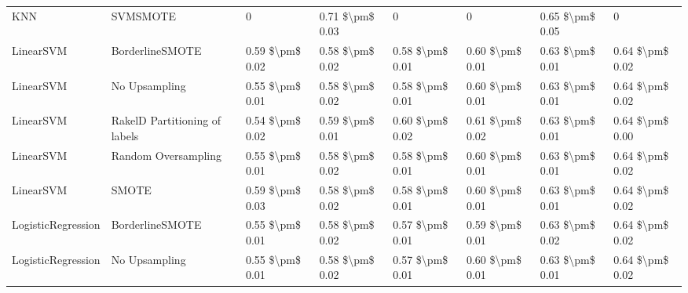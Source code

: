 \begin{tabular}{llllllll}
                            KNN &                      SVMSMOTE &                   0 &           0.71 \$\textbackslash pm\$ 0.03 &                     0 &                      0 &                         0.65 \$\textbackslash pm\$ 0.05 &                   0 \\
                      LinearSVM &               BorderlineSMOTE &     0.59 \$\textbackslash pm\$ 0.02 &           0.58 \$\textbackslash pm\$ 0.02 &       0.58 \$\textbackslash pm\$ 0.01 &        0.60 \$\textbackslash pm\$ 0.01 &                         0.63 \$\textbackslash pm\$ 0.01 &     0.64 \$\textbackslash pm\$ 0.02 \\
                      LinearSVM &                 No Upsampling &     0.55 \$\textbackslash pm\$ 0.01 &           0.58 \$\textbackslash pm\$ 0.02 &       0.58 \$\textbackslash pm\$ 0.01 &        0.60 \$\textbackslash pm\$ 0.01 &                         0.63 \$\textbackslash pm\$ 0.01 &     0.64 \$\textbackslash pm\$ 0.02 \\
                      LinearSVM & RakelD Partitioning of labels &     0.54 \$\textbackslash pm\$ 0.02 &           0.59 \$\textbackslash pm\$ 0.01 &       0.60 \$\textbackslash pm\$ 0.02 &        0.61 \$\textbackslash pm\$ 0.02 &                         0.63 \$\textbackslash pm\$ 0.01 &     0.64 \$\textbackslash pm\$ 0.00 \\
                      LinearSVM &           Random Oversampling &     0.55 \$\textbackslash pm\$ 0.01 &           0.58 \$\textbackslash pm\$ 0.02 &       0.58 \$\textbackslash pm\$ 0.01 &        0.60 \$\textbackslash pm\$ 0.01 &                         0.63 \$\textbackslash pm\$ 0.01 &     0.64 \$\textbackslash pm\$ 0.02 \\
                      LinearSVM &                         SMOTE &     0.59 \$\textbackslash pm\$ 0.03 &           0.58 \$\textbackslash pm\$ 0.02 &       0.58 \$\textbackslash pm\$ 0.01 &        0.60 \$\textbackslash pm\$ 0.01 &                         0.63 \$\textbackslash pm\$ 0.01 &     0.64 \$\textbackslash pm\$ 0.02 \\
             LogisticRegression &               BorderlineSMOTE &     0.55 \$\textbackslash pm\$ 0.01 &           0.58 \$\textbackslash pm\$ 0.02 &       0.57 \$\textbackslash pm\$ 0.01 &        0.59 \$\textbackslash pm\$ 0.01 &                         0.63 \$\textbackslash pm\$ 0.02 &     0.64 \$\textbackslash pm\$ 0.02 \\
             LogisticRegression &                 No Upsampling &     0.55 \$\textbackslash pm\$ 0.01 &           0.58 \$\textbackslash pm\$ 0.02 &       0.57 \$\textbackslash pm\$ 0.01 &        0.60 \$\textbackslash pm\$ 0.01 &                         0.63 \$\textbackslash pm\$ 0.01 &     0.64 \$\textbackslash pm\$ 0.02 \\

\end{tabular}
